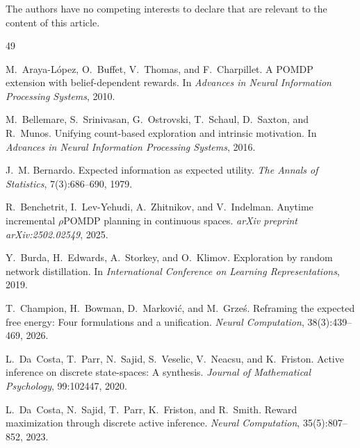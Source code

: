 \documentclass[runningheads]{llncs}
\begin{document}
\begin{credits}
\subsubsection{\discintname}
The authors have no competing interests to declare that are relevant to the content of this article.
\end{credits}

\begin{thebibliography}{49}

M.~Araya-L\'{o}pez, O.~Buffet, V.~Thomas, and F.~Charpillet.
\newblock A {POMDP} extension with belief-dependent rewards.
\newblock In \emph{Advances in Neural Information Processing Systems}, 2010.

M.~Bellemare, S.~Srinivasan, G.~Ostrovski, T.~Schaul, D.~Saxton, and R.~Munos.
\newblock Unifying count-based exploration and intrinsic motivation.
\newblock In \emph{Advances in Neural Information Processing Systems}, 2016.

J.~M. Bernardo.
\newblock Expected information as expected utility.
\newblock \emph{The Annals of Statistics}, 7(3):686--690, 1979.

R.~Benchetrit, I.~Lev-Yehudi, A.~Zhitnikov, and V.~Indelman.
\newblock Anytime incremental $\rho${POMDP} planning in continuous spaces.
\newblock \emph{arXiv preprint arXiv:2502.02549}, 2025.

Y.~Burda, H.~Edwards, A.~Storkey, and O.~Klimov.
\newblock Exploration by random network distillation.
\newblock In \emph{International Conference on Learning Representations}, 2019.

T.~Champion, H.~Bowman, D.~Markovi\'{c}, and M.~Grze\'{s}.
\newblock Reframing the expected free energy: Four formulations and a unification.
\newblock \emph{Neural Computation}, 38(3):439--469, 2026.

L.~Da~Costa, T.~Parr, N.~Sajid, S.~Veselic, V.~Neacsu, and K.~Friston.
\newblock Active inference on discrete state-spaces: A synthesis.
\newblock \emph{Journal of Mathematical Psychology}, 99:102447, 2020.

L.~Da~Costa, N.~Sajid, T.~Parr, K.~Friston, and R.~Smith.
\newblock Reward maximization through discrete active inference.
\newblock \emph{Neural Computation}, 35(5):807--852, 2023.


\end{thebibliography}
\end{document}
